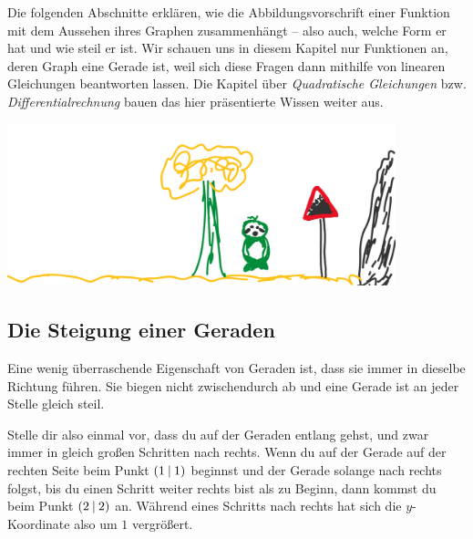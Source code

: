 \documentclass[../../main.tex]{subfiles}
\begin{document}
Die folgenden Abschnitte erklären, wie die Abbildungsvorschrift einer Funktion mit dem Aussehen ihres Graphen zusammenhängt -- also auch, welche Form er hat und wie steil er ist. Wir schauen uns in diesem Kapitel nur Funktionen an, deren Graph eine Gerade ist, weil sich diese Fragen dann mithilfe von linearen Gleichungen beantworten lassen. Die Kapitel über \emph{Quadratische Gleichungen} bzw. \emph{Differentialrechnung} bauen das hier präsentierte Wissen weiter aus.

\begin{center}
    \includegraphics[height=4.7cm]{images/slope.png}
\end{center}

\subsection{Die Steigung einer Geraden}

Eine wenig überraschende Eigenschaft von Geraden ist, dass sie immer in dieselbe Richtung führen. Sie biegen nicht zwischendurch ab und eine Gerade ist an jeder Stelle gleich steil.

Stelle dir also einmal vor, dass du auf der Geraden entlang gehst, und zwar immer in gleich großen Schritten nach rechts. Wenn du auf der Gerade auf der rechten Seite beim Punkt $\left(1 \:\middle|\: 1\right)$ beginnst und der Gerade solange nach rechts folgst, bis du einen Schritt weiter rechts bist als zu Beginn, dann kommst du beim Punkt $\left(2 \:\middle|\: 2\right)$ an. Während eines Schritts nach rechts hat sich die $y$-Koordinate also um $1$ vergrößert.
\end{document}
